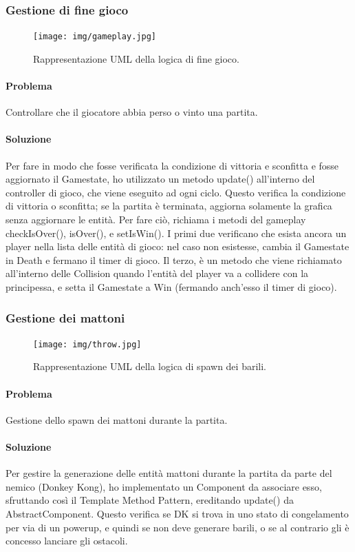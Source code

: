 \documentclass[a4paper,12pt]{report}
\begin{document}
\subsubsection{Gestione di fine gioco}

\begin{figure}[H]
\centering{}
\texttt{[image: img/gameplay.jpg]}
\caption{Rappresentazione UML della logica di fine gioco.}
\end{figure}

\paragraph{Problema} Controllare che il giocatore abbia perso o vinto una partita.

\paragraph{Soluzione} Per fare in modo che fosse verificata la condizione di vittoria e sconfitta e fosse aggiornato il Gamestate, ho utilizzato un metodo update() all’interno del controller di gioco, che viene eseguito ad ogni ciclo. Questo verifica la condizione di vittoria o sconfitta; se la partita è terminata, aggiorna solamente la grafica senza aggiornare le entità. Per fare ciò, richiama i metodi del gameplay checkIsOver(), isOver(), e setIsWin(). I primi due verificano che esista ancora un player nella lista delle entità di gioco: nel caso non esistesse, cambia il Gamestate in Death e fermano il timer di gioco. Il terzo, è un metodo che viene richiamato all’interno delle Collision quando l’entità del player va a collidere con la principessa, e setta il Gamestate a Win (fermando anch’esso il timer di gioco).

\subsubsection{Gestione dei mattoni}

\begin{figure}[H]
\centering{}
\texttt{[image: img/throw.jpg]}
\caption{Rappresentazione UML della logica di spawn dei barili.}
\end{figure}

\paragraph{Problema} Gestione dello spawn dei mattoni durante la partita.

\paragraph{Soluzione} Per gestire la generazione delle entità mattoni durante la partita da parte del nemico (Donkey Kong), ho implementato un Component da associare esso, sfruttando così il Template Method Pattern, ereditando update() da AbstractComponent. Questo verifica se DK si trova in uno stato di congelamento per via di un powerup, e quindi se non deve generare barili, o se al contrario gli è concesso lanciare gli ostacoli.
\end{document}
